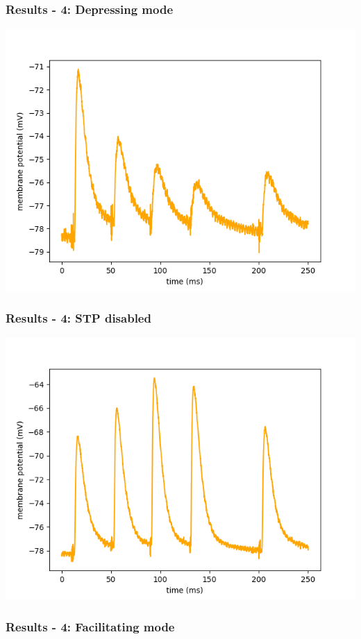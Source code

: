 \documentclass{beamer}
\begin{document}
\begin{frame}
	\frametitle{Results - 4: Depressing mode}
	\centering
	\includegraphics[width=\textwidth]{figures/stp_depressing.png}
\end{frame}
\begin{frame}
	\frametitle{Results - 4: STP disabled}
	\centering
	\includegraphics[width=\textwidth]{figures/stp_off.png}
\end{frame}

\begin{frame}
	\frametitle{Results - 4: Facilitating mode}
	
\end{frame}
\end{document}
